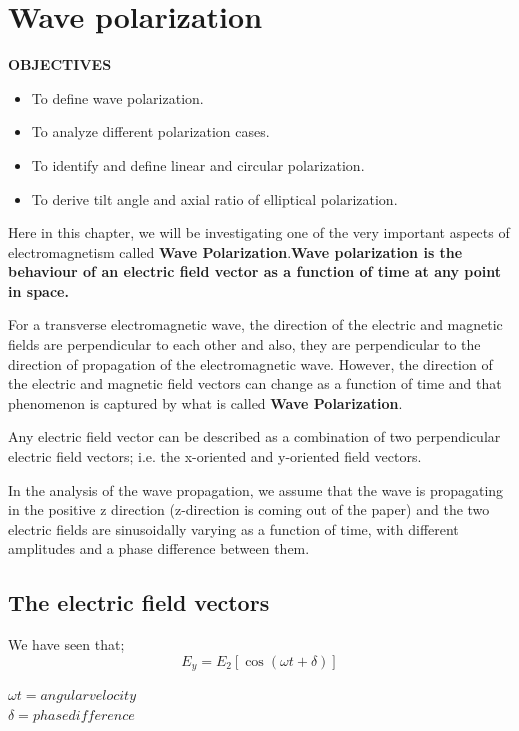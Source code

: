 \chapter{Wave polarization}\label{lec:lec23} \textbf{OBJECTIVES}
\begin{itemize}
	\item To define wave polarization.
	\item To analyze different polarization cases.
	\item To identify and define linear and circular polarization.
	\item To derive tilt angle and axial ratio of elliptical polarization.
	
\end{itemize}

Here in this chapter, we will be investigating one of the very important aspects of electromagnetism called \textbf{Wave Polarization}.\textbf{Wave polarization is the behaviour of an electric field vector as a function of time at any point in space.}

For a transverse electromagnetic wave, the direction of the electric and magnetic fields are perpendicular to each other and also, they are perpendicular to the direction of propagation of the electromagnetic wave. However, the direction of the electric and magnetic field vectors can change as a function of time and that phenomenon is captured by what is called \textbf{Wave Polarization}.

Any electric field vector can be described as a combination of two perpendicular electric field vectors; i.e. the x-oriented and y-oriented field vectors. 

In the analysis of the wave propagation, we assume that the wave is propagating in the positive z direction (z-direction is coming out of the paper) and the two electric fields are sinusoidally varying as a function of time, with different amplitudes and a phase difference between them.	

\section{The electric field vectors} 
We have seen that;
\begin{equation}
E_y = E_2 [\cos(\omega t + \delta)]
\end{equation}


    $\omega t =angular  velocity$\\
    
 	 $\delta   =phase  difference$\\

